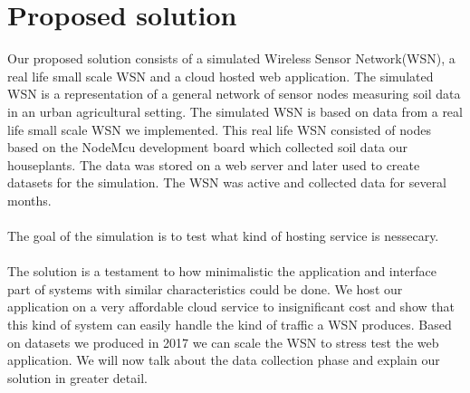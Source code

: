 \documentclass[]{uiophd}
\begin{document}
\section{Proposed solution}
Our proposed solution consists of a simulated Wireless Sensor Network(WSN), a real life small scale WSN and a cloud hosted web application. The simulated WSN is a representation of a general network of sensor nodes measuring soil data in an urban agricultural setting. The simulated WSN is based on data from a real life small scale WSN we implemented. This real life WSN consisted of nodes based on the NodeMcu development board which collected soil data our houseplants. The data was stored on a web server and later used to create datasets for the simulation. The WSN was active and collected data for several months. 
\\\\
The goal of the simulation is to test what kind of hosting service is nessecary.
\\\\
The solution is a testament to how minimalistic the application and interface part of systems with similar characteristics could be done. We host our application on a very affordable cloud service to insignificant cost and show that this kind of system can easily handle the kind of traffic a WSN produces. Based on datasets we produced in 2017 we can scale the WSN to stress test the web application. We will now talk about the data collection phase and explain our solution in greater detail.
\end{document}
